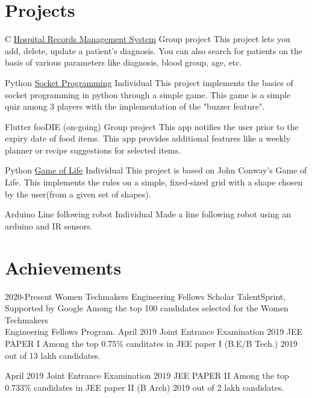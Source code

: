 \documentclass[]{twentysecondcv}
\begin{document}
\section{Projects}

\begin{twenty}
  \twentyitem
    {C}
    {\href{https://gitlab.com/avantikaaa/hospital-records-management-system}{Hospital Records Management System}}    
    {Group project}
    {This project lets you add, delete, update a patient's diagnosis. You can also search for patients on the basis of various parameters like diagnosis, blood group, age, etc.}

  \twentyitem
    {Python}
    {\href{https://gitlab.com/avantikaaa/socket-programming}{Socket Programming}}
    {Individual}
    {This project implements the basics of socket programming in python through a simple game. This game is a simple quiz among 3 players with the implementation of the "buzzer feature".}

  \twentyitem
    {Flutter}
    {fooDIE (on-going)}
    {Group project}
    {This app notifies the user prior to the expiry date of food items. This app provides additional features like a weekly planner or recipe suggestions for selected items.}
    
  \twentyitem
  	{Python}
  	{\href{https://gitlab.com/avantikaaa/game-of-life}{Game of Life}}
  	{Individual}
  	{This project is based on John Conway's Game of Life. This implements the rules on a simple, fixed-sized grid with a shape chosen by the user(from a given set of shapes).}
  
  \twentyitem
  	{Arduino}
  	{Line following robot}
  	{Individual}
  	{Made a line following robot using an arduino and IR sensors.}
\end{twenty}

\section{Achievements}
\begin{twenty}
  \twentyitem
  	{2020-Present}
    {Women Techmakers Engineering Fellows Scholar}
    {TalentSprint, Supported by Google}
    {Among the top 100 candidates selected for the Women Techmakers \\Engineering Fellows Program.}
  \twentyitem
  	{April 2019}
  	{Joint Entrance Examination 2019}
  	{JEE PAPER I}
  	{Among the top 0.75\% canditates in JEE paper I (B.E/B Tech.) 2019 out of 13 lakh candidates.}

  \twentyitem
  	{April 2019}
  	{Joint Entrance Examination 2019}
  	{JEE PAPER II}
  	{Among the top 0.733\% candidates in JEE paper II (B Arch) 2019 out of 2 lakh candidates.}
\end{twenty}
\end{document}
